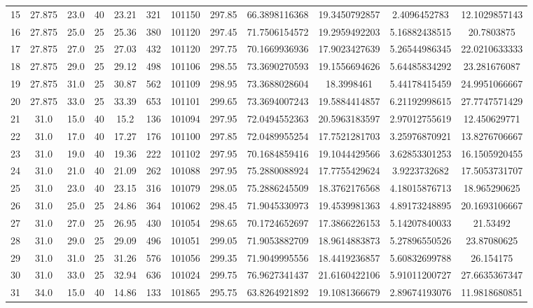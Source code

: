 \begin{table}[H]
\begin{center}
\begin{tabular}{|cccccccccccc|}
	15 & 27.875 & 23.0 & 40 & 23.21 & 321 & 101150 & 297.85 & 66.3898116368 & 19.3450792857 & 2.4096452783 & 12.1029857143\\
	16 & 27.875 & 25.0 & 25 & 25.36 & 380 & 101120 & 297.45 & 71.7506154572 & 19.2959492203 & 5.16882438515 & 20.7803875\\
	17 & 27.875 & 27.0 & 25 & 27.03 & 432 & 101120 & 297.75 & 70.1669936936 & 17.9023427639 & 5.26544986345 & 22.0210633333\\
	18 & 27.875 & 29.0 & 25 & 29.12 & 498 & 101106 & 298.55 & 73.3690270593 & 19.1556694626 & 5.64485834292 & 23.281676087\\
	19 & 27.875 & 31.0 & 25 & 30.87 & 562 & 101109 & 298.95 & 73.3688028604 & 18.3998461 & 5.44178415459 & 24.9951066667\\
	20 & 27.875 & 33.0 & 25 & 33.39 & 653 & 101101 & 299.65 & 73.3694007243 & 19.5884414857 & 6.21192998615 & 27.7747571429\\
	21 & 31.0 & 15.0 & 40 & 15.2 & 136 & 101094 & 297.95 & 72.0494552363 & 20.5963183597 & 2.97012755619 & 12.450629771\\
	22 & 31.0 & 17.0 & 40 & 17.27 & 176 & 101100 & 297.85 & 72.0489955254 & 17.7521281703 & 3.25976870921 & 13.8276706667\\
	23 & 31.0 & 19.0 & 40 & 19.36 & 222 & 101102 & 297.95 & 70.1684859416 & 19.1044429566 & 3.62853301253 & 16.1505920455\\
	24 & 31.0 & 21.0 & 40 & 21.09 & 262 & 101088 & 297.95 & 75.2880088924 & 17.7755429624 & 3.9223732682 & 17.5053731707\\
	25 & 31.0 & 23.0 & 40 & 23.15 & 316 & 101079 & 298.05 & 75.2886245509 & 18.3762176568 & 4.18015876713 & 18.965290625\\
	26 & 31.0 & 25.0 & 25 & 24.86 & 364 & 101062 & 298.45 & 71.9045330973 & 19.4539981363 & 4.89173248895 & 20.1693106667\\
	27 & 31.0 & 27.0 & 25 & 26.95 & 430 & 101054 & 298.65 & 70.1724652697 & 17.3866226153 & 5.14207840033 & 21.53492\\
	28 & 31.0 & 29.0 & 25 & 29.09 & 496 & 101051 & 299.05 & 71.9053882709 & 18.9614883873 & 5.27896550526 & 23.87080625\\
	29 & 31.0 & 31.0 & 25 & 31.26 & 576 & 101056 & 299.35 & 71.9049995556 & 18.4419236857 & 5.60832699788 & 26.154175\\
	30 & 31.0 & 33.0 & 25 & 32.94 & 636 & 101024 & 299.75 & 76.9627341437 & 21.6160422106 & 5.91011200727 & 27.6635367347\\
	31 & 34.0 & 15.0 & 40 & 14.86 & 133 & 101865 & 295.75 & 63.8264921892 & 19.1081366679 & 2.89674193076 & 11.9818680851\\

\end{tabular}
\end{center}
\end{table}
